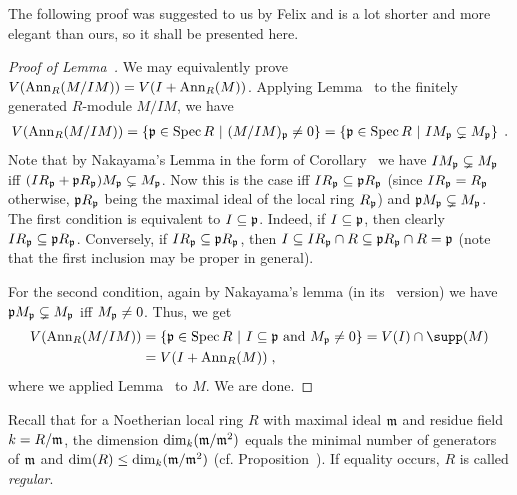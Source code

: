 \documentclass[a4paper,parskip=half,numbers=enddot, DIV=12, headheight=30pt]{scrreprt}
\begin{document}
The following proof was suggested to us by Felix and is a lot shorter and more elegant than ours, so it shall be presented here.
\begin{proof}[Proof of Lemma~]
	We may equivalently prove $V(\operatorname{Ann}_R(M/IM))=V(I+\operatorname{Ann}_R(M))$. Applying  Lemma~ to the finitely generated $R$-module $M/IM$, we have
	\begin{align*}
		V(\operatorname{Ann}_R(M/IM))=\left\{\mathfrak{p}\in\operatorname{Spec} R\ \middle|\  (M/IM)_{\mathfrak{p}}\neq 0\right\}=\left\{\mathfrak{p}\in\operatorname{Spec} R\ \middle|\  IM_{\mathfrak{p}}\subsetneq M_{\mathfrak{p}}\right\}\;.
	\end{align*}
	Note that by Nakayama's Lemma in the form of Corollary~ we have $IM_{\mathfrak{p}}\subsetneq M_{\mathfrak{p}}$ iff $(IR_{\mathfrak{p}}+\mathfrak{p} R_{\mathfrak{p}})M_{\mathfrak{p}}\subsetneq M_{\mathfrak{p}}$. Now this is the case iff $IR_{\mathfrak{p}}\subseteq \mathfrak{p} R_{\mathfrak{p}}$ (since $IR_{\mathfrak{p}}=R_{\mathfrak{p}}$ otherwise, $\mathfrak{p} R_{\mathfrak{p}}$ being the maximal ideal of the local ring $R_{\mathfrak{p}}$) and $\mathfrak{p} M_{\mathfrak{p}}\subsetneq M_{\mathfrak{p}}$. The first condition is equivalent to $I\subseteq \mathfrak{p}$. Indeed, if $I\subseteq \mathfrak{p}$, then clearly $IR_{\mathfrak{p}}\subseteq \mathfrak{p} R_{\mathfrak{p}}$. Conversely, if $IR_{\mathfrak{p}}\subseteq \mathfrak{p} R_{\mathfrak{p}}$, then $I\subseteq IR_{\mathfrak{p}}\cap R\subseteq\mathfrak{p} R_{\mathfrak{p}}\cap R=\mathfrak{p}$ (note that the first inclusion may be proper in general).
	
	For the second condition, again by Nakayama's lemma (in its \NAK\ version) we have $\mathfrak{p} M_{\mathfrak{p}}\subsetneq M_{\mathfrak{p}}$ iff $M_{\mathfrak{p}}\neq 0$. Thus, we get
	\begin{align*}
		V(\Ann_R(M/IM))&=\left\{\pp\in \Spec R\st I\subseteq \pp \text{ and }M_\pp\neq 0\right\}=V(I)\cap \supp(M)\\
		&=V(I+\Ann_R(M))\;,
	\end{align*}
	where we applied Lemma~ to $M$. We are done.
\end{proof}
 Recall that for a Noetherian local ring $R$ with maximal ideal $\mathfrak{m}$ and residue field $k=R/\mathfrak{m}$, the dimension $\dim_k(\mathfrak{m}/\mathfrak{m}^2)$ equals the minimal number of generators of $\mathfrak{m}$ and $\dim(R) \leq \dim_k(\mathfrak{m}/\mathfrak{m}^2)$ (cf. Proposition~). If equality occurs, $R$ is called \emph{regular}.
\end{document}
